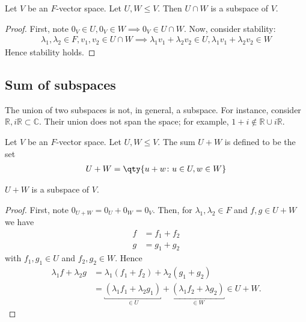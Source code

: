     \begin{proposition}
        Let $V$ be an $F$-vector space.
        Let $U, W \leq V$.
        Then $U \cap W$ is a subspace of $V$.
    \end{proposition}
    \begin{proof}
        First, note $0_V \in U, 0_V \in W \implies 0_V \in U \cap W$.
        Now, consider stability:
        \begin{align*}
            \lambda_1, \lambda_2 \in F, v_1, v_2 \in U \cap W \implies \lambda_1 v_1 + \lambda_2 v_2 \in U, \lambda_1 v_1 + \lambda_2 v_2 \in W
        \end{align*}
        Hence stability holds.
    \end{proof}

    \subsection{Sum of subspaces}
    \begin{warning}
        The union of two subspaces is not, in general, a subspace.
        For instance, consider $\mathbb R, i\mathbb R \subset \mathbb C$.
        Their union does not span the space; for example, $1 + i \notin \mathbb R \cup i\mathbb R$.
    \end{warning}

    \begin{definition}
        Let $V$ be an $F$-vector space.
        Let $U, W \leq V$.
        The sum $U + W$ is defined to be the set
        \begin{align*}
            U + W = \qty{ u + w \colon u \in U, w \in W }
        \end{align*}
    \end{definition}
    \begin{proposition}
        $U + W$ is a subspace of $V$.
    \end{proposition}
    \begin{proof}
        First, note $0_{U+W} = 0_U + 0_W = 0_V$.
        Then, for $\lambda_1, \lambda_2 \in F$ and $f, g \in U + W$ we have 
        \begin{align*}
            f &= f_1 + f_2 \\
            g &= g_1 + g_2
        \end{align*} with $f_1, g_1 \in U$ and $f_2, g_2 \in W$.
        Hence 
        \begin{align*}
            \lambda_1 f + \lambda_2 g &= \lambda_1 (f_1 + f_2) + \lambda_2 (g_1 + g_2) \\
            &= \underbracket{(\lambda_1 f_1 + \lambda_2 g_1)}_{\in U} + \underbracket{(\lambda_1 f_2 + \lambda g_2)}_{\in W} \in U + W.
        \end{align*} 
    \end{proof}

